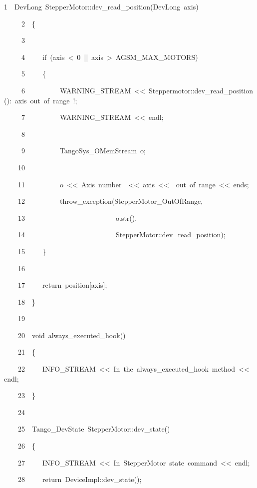 
\begin{lyxcode}
1~~DevLong~StepperMotor::dev\_read\_position(DevLong~axis)

~~~~~2~~\{

~~~~~3~~

~~~~~4~~~~~if~(axis~<~0~||~axis~>~AGSM\_MAX\_MOTORS)

~~~~~5~~~~~\{

~~~~~6~~~~~~~~~~WARNING\_STREAM~<\textcompwordmark{}<~\textquotedbl{}Steppermotor::dev\_read\_position():~axis~out~of~range~!\textquotedbl{};

~~~~~7~~~~~~~~~~WARNING\_STREAM~<\textcompwordmark{}<~endl;

~~~~~8~~~~~~~~~~~~~~~~~~

~~~~~9~~~~~~~~~~TangoSys\_OMemStream~o;

~~~~10~~~~~~~~~~~~~~~~~~

~~~~11~~~~~~~~~~o~<\textcompwordmark{}<~\textquotedbl{}Axis~number~\textquotedbl{}~<\textcompwordmark{}<~axis~<\textcompwordmark{}<~\textquotedbl{}~out~of~range\textquotedbl{}~<\textcompwordmark{}<~ends;

~~~~12~~~~~~~~~~throw\_exception(\textquotedbl{}StepperMotor\_OutOfRange\textquotedbl{},

~~~~13~~~~~~~~~~~~~~~~~~~~~~~~~~o.str(),

~~~~14~~~~~~~~~~~~~~~~~~~~~~~~~~\textquotedbl{}StepperMotor::dev\_read\_position\textquotedbl{});

~~~~15~~~~~\}

~~~~16~~

~~~~17~~~~~return~position{[}axis{]};

~~~~18~~\}

~~~~19~~

~~~~20~~void~always\_executed\_hook()

~~~~21~~\{

~~~~22~~~~~INFO\_STREAM~<\textcompwordmark{}<~\textquotedbl{}In~the~always\_executed\_hook~method~<\textcompwordmark{}<~endl;

~~~~23~~\}

~~~~24~~

~~~~25~~Tango\_DevState~StepperMotor::dev\_state()

~~~~26~~\{

~~~~27~~~~~INFO\_STREAM~<\textcompwordmark{}<~\textquotedbl{}In~StepperMotor~state~command\textquotedbl{}~<\textcompwordmark{}<~endl;

~~~~28~~~~~return~DeviceImpl::dev\_state();


\end{lyxcode}
